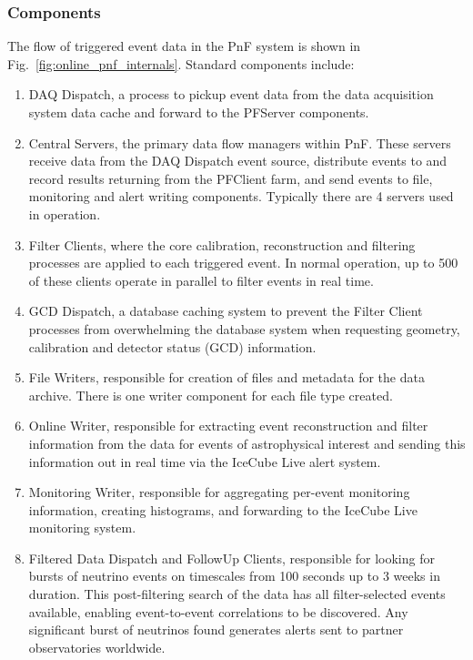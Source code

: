 \subsubsection{Components}

The flow of triggered event data in the PnF
system is shown in Fig.~\ref{fig:online_pnf_internals}.  Standard
components include: 
\begin{enumerate}
\item DAQ Dispatch, a process to pickup event data from the data
  acquisition system data cache and forward to the PFServer components.
\item Central Servers, the primary data flow managers within PnF.  These
  servers receive data from the 
  DAQ Dispatch event source, distribute events to and record results
  returning from the PFClient farm, and send events to file, monitoring and
  alert writing components.  Typically there are 4 servers used in
  operation.
\item Filter Clients, where the core calibration, reconstruction and
  filtering processes are applied to each triggered event.  In normal
  operation, up to 500 of these clients operate in parallel to filter
  events in real time.
\item GCD Dispatch, a database caching system to prevent the
  Filter Client processes from overwhelming the database system when requesting
  geometry, calibration and detector status (GCD) information.  
\item File Writers, responsible for creation of files and metadata for
  the data archive.  There is one writer component for each file type created.
\item Online Writer, responsible for extracting event reconstruction and
  filter information from the data for events of astrophysical interest and
  sending this information out in real time via the IceCube Live alert
  system.
\item Monitoring Writer, responsible for aggregating per-event monitoring
  information, creating histograms, and forwarding to the IceCube Live
  monitoring system.
\item Filtered Data Dispatch and FollowUp Clients, responsible for
  looking for bursts of neutrino events on timescales from 100 seconds up
  to 3 weeks in duration. This post-filtering search of the data has all
  filter-selected events available, enabling event-to-event
  correlations to be discovered.  Any significant burst of neutrinos found generates alerts
  sent to partner observatories worldwide.
\end{enumerate}

